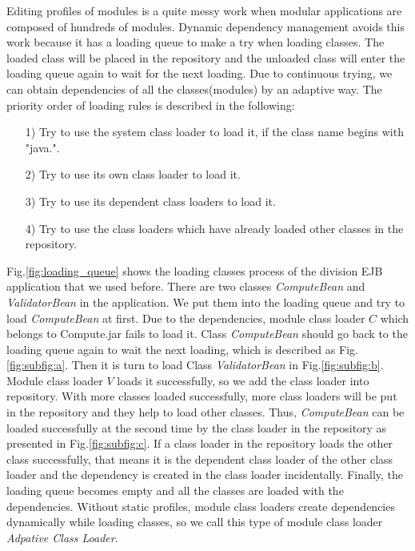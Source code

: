 \documentclass[conference]{IEEEtran}
\begin{document}
Editing profiles of modules is a quite messy work when modular applications are composed of hundreds of modules.
Dynamic dependency management avoids this work because it has a loading queue to make a try when loading classes.
The loaded class will be placed in the repository and the unloaded class will enter the loading queue again to wait for the next loading.
Due to continuous trying, we can obtain dependencies of all the classes(modules) by an adaptive way.
The priority order of loading rules is described in the following:
\begin{itemize}[]
\item[1)] Try to use the system class loader to load it, if the class name begins with "java.".
\item[2)] Try to use its own class loader to load it.
\item[3)] Try to use its dependent class loaders to load it.
\item[4)] Try to use the class loaders which have already loaded other classes in the repository. 
\end{itemize}

Fig.\ref{fig:loading_queue} shows the loading classes process of the division EJB application that we used before. 
There are two classes \emph{ComputeBean} and \emph{ValidatorBean} in the application. 
We put them into the loading queue and try to load \emph{ComputeBean} at first. 
Due to the dependencies, module class loader $C$ which belongs to Compute.jar fails to load it. 
Class \emph{ComputeBean} should go back to the loading queue again to wait the next loading, which is described as Fig.\ref{fig:subfig:a}. 
Then it is turn to load Class \emph{ValidatorBean} in Fig.\ref{fig:subfig:b}. 
Module class loader $V$ loads it successfully, so we add the class loader into repository. 
With more classes loaded successfully, more class loaders will be put in the repository and they help to load other classes. 
Thus, \emph{ComputeBean} can be loaded successfully at the second time by the class loader in the repository as presented in Fig.\ref{fig:subfig:c}.
If a class loader in the repository loads the other class successfully, that means it is the dependent class loader of the other class loader and the dependency is created in the class loader incidentally. 
Finally, the loading queue becomes empty and all the classes are loaded with the dependencies.
Without static profiles, module class loaders create dependencies dynamically while loading classes, so we call this type of module class loader \emph{Adpative Class Loader}.
\end{document}
